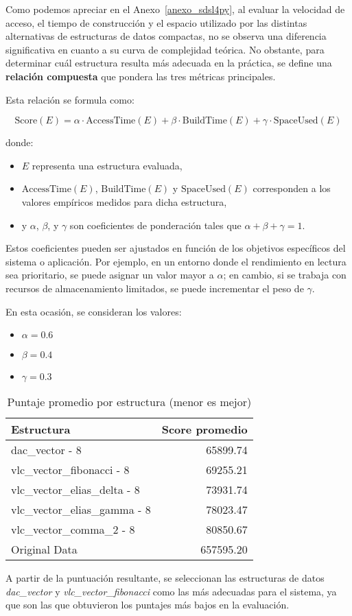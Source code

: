 Como podemos apreciar en el Anexo~\ref{anexo_sdsl4py}, al evaluar la velocidad de acceso, el tiempo de construcción y el espacio utilizado por las distintas alternativas de estructuras de datos compactas, no se observa una diferencia significativa en cuanto a su curva de complejidad teórica. No obstante, para determinar cuál estructura resulta más adecuada en la práctica, se define una \textbf{relación compuesta} que pondera las tres métricas principales.

Esta relación se formula como:

\begin{equation}
\text{Score}(E) = \alpha \cdot \text{AccessTime}(E) + \beta \cdot \text{BuildTime}(E) + \gamma \cdot \text{SpaceUsed}(E)
\end{equation}

donde:
\begin{itemize}
    \item $E$ representa una estructura evaluada,
    \item $\text{AccessTime}(E)$, $\text{BuildTime}(E)$ y $\text{SpaceUsed}(E)$ corresponden a los valores empíricos medidos para dicha estructura,
    \item y $\alpha$, $\beta$, y $\gamma$ son coeficientes de ponderación tales que $\alpha + \beta + \gamma = 1$.
\end{itemize}

Estos coeficientes pueden ser ajustados en función de los objetivos específicos del sistema o aplicación. Por ejemplo, en un entorno donde el rendimiento en lectura sea prioritario, se puede asignar un valor mayor a $\alpha$; en cambio, si se trabaja con recursos de almacenamiento limitados, se puede incrementar el peso de $\gamma$. 

En esta ocasión, se consideran los valores:

\begin{itemize}
    \item $\alpha = 0.6$
	\item $\beta = 0.4$
	\item $\gamma = 0.3$
\end{itemize}

\begin{table}[H]
\centering
\caption{Puntaje promedio por estructura (menor es mejor)}
\label{tab:score_promedio_estructuras}
\begin{tabular}{l r}
\toprule
\textbf{Estructura} & \textbf{Score promedio} \\
\midrule
dac\_vector - 8              & 65899.74 \\
vlc\_vector\_fibonacci - 8   & 69255.21 \\
vlc\_vector\_elias\_delta - 8 & 73931.74 \\
vlc\_vector\_elias\_gamma - 8 & 78023.47 \\
vlc\_vector\_comma\_2 - 8     & 80850.67 \\
Original Data                & 657595.20 \\
\bottomrule
\end{tabular}
\end{table}

A partir de la puntuación resultante, se seleccionan las estructuras de datos \textit{dac\_vector} y \textit{vlc\_vector\_fibonacci} como las más adecuadas para el sistema, ya que son las que obtuvieron los puntajes más bajos en la evaluación.